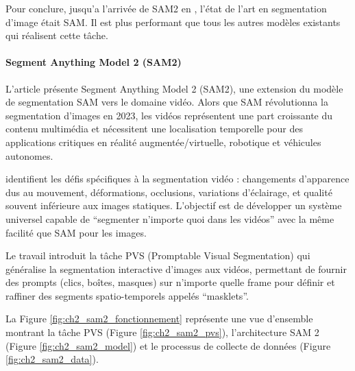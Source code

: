 Pour conclure, jusqu'a l'arrivée de SAM2 en \citeyear{ravi_sam_2024}, l’état de l’art en segmentation d’image était SAM. Il est plus performant que tous les autres modèles existants qui réalisent cette tâche.

\paragraph{Segment Anything Model 2 (SAM2)}
L'article \cite{ravi_sam_2024} présente Segment Anything Model 2 (SAM2), une extension du modèle de segmentation SAM vers le domaine vidéo. Alors que SAM révolutionna la segmentation d'images en 2023, les vidéos représentent une part croissante du contenu multimédia et nécessitent une localisation temporelle pour des applications critiques en réalité augmentée/virtuelle, robotique et véhicules autonomes.

\citeauthor{ravi_sam_2024} identifient les défis spécifiques à la segmentation vidéo : changements d'apparence dus au mouvement, déformations, occlusions, variations d'éclairage, et qualité souvent inférieure aux images statiques. L'objectif est de développer un système universel capable de ``segmenter n'importe quoi dans les vidéos'' avec la même facilité que SAM pour les images.

Le travail introduit la tâche PVS (Promptable Visual Segmentation) qui généralise la segmentation interactive d'images aux vidéos, permettant de fournir des prompts (clics, boîtes, masques) sur n'importe quelle frame pour définir et raffiner des segments spatio-temporels appelés ``masklets''.

La Figure \ref{fig:ch2_sam2_fonctionnement} représente une vue d'ensemble montrant la tâche PVS (Figure \ref{fig:ch2_sam2_pvs}), l'architecture SAM 2 (Figure \ref{fig:ch2_sam2_model}) et le processus de collecte de données (Figure \ref{fig:ch2_sam2_data}).

